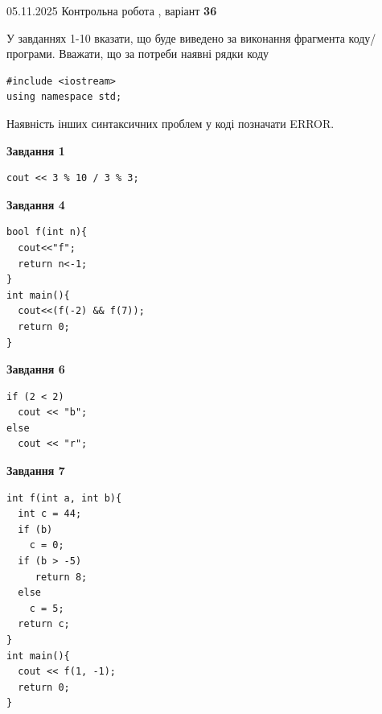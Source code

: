\documentclass[12pt, ukrainian]{article}
\begin{document}
{\Large{05.11.2025 Контрольна робота , варіант  \No \textbf { 36 }\par}}
{
\begin {large}
У завданнях 1-10 вказати, що буде виведено за виконання фрагмента коду/про\-гра\-ми.
Вважати, що за потреби наявні рядки коду
\begin{verbatim}
#include <iostream>
using namespace std;
\end{verbatim}
Наявність інших синтаксичних проблем у коді позначати ERROR.

\begin{minipage}[t]{7.0cm}

\begin{center}
\textbf{Завдання 1}
\end{center}
\vspace{-8mm}

\begin{verbatim}
cout << 3 % 10 / 3 % 3;
\end{verbatim}



\begin{center}
\textbf{Завдання 4}
\end{center}
\vspace{-8mm}

\begin{verbatim}
bool f(int n){
  cout<<"f";
  return n<-1;
}
int main(){
  cout<<(f(-2) && f(7));
  return 0;
}
\end{verbatim}



\begin{center}
\textbf{Завдання 6}
\end{center}
\vspace{-8mm}

\begin{verbatim}
if (2 < 2)
  cout << "b";
else
  cout << "r";
\end{verbatim}



\begin{center}
\textbf{Завдання 7}
\end{center}
\vspace{-8mm}

\begin{verbatim}
int f(int a, int b){
  int c = 44;
  if (b)
    c = 0;
  if (b > -5)
     return 8;
  else
    c = 5;
  return c;
}
int main(){
  cout << f(1, -1);
  return 0;
}
\end{verbatim}


\end{minipage}
\end{large}}
\end{document}
